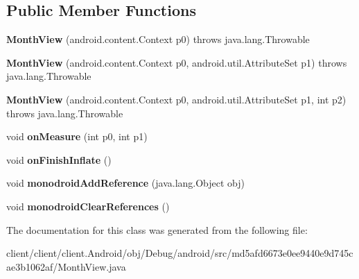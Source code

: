 \subsection*{Public Member Functions}
\begin{DoxyCompactItemize}
\item 
\hypertarget{classmd5afd6673e0ee9440e9d745cae3b1062af_1_1MonthView_a9ef524ff0f996035fa14c0d659f7e987}{}{\bfseries Month\+View} (android.\+content.\+Context p0)  throws java.\+lang.\+Throwable 	\label{classmd5afd6673e0ee9440e9d745cae3b1062af_1_1MonthView_a9ef524ff0f996035fa14c0d659f7e987}

\item 
\hypertarget{classmd5afd6673e0ee9440e9d745cae3b1062af_1_1MonthView_a6b89a92a805bdc1ae1fdb5527ba33481}{}{\bfseries Month\+View} (android.\+content.\+Context p0, android.\+util.\+Attribute\+Set p1)  throws java.\+lang.\+Throwable 	\label{classmd5afd6673e0ee9440e9d745cae3b1062af_1_1MonthView_a6b89a92a805bdc1ae1fdb5527ba33481}

\item 
\hypertarget{classmd5afd6673e0ee9440e9d745cae3b1062af_1_1MonthView_a150f9bdc858b3f7a3dc5a6b38a5537ba}{}{\bfseries Month\+View} (android.\+content.\+Context p0, android.\+util.\+Attribute\+Set p1, int p2)  throws java.\+lang.\+Throwable 	\label{classmd5afd6673e0ee9440e9d745cae3b1062af_1_1MonthView_a150f9bdc858b3f7a3dc5a6b38a5537ba}

\item 
\hypertarget{classmd5afd6673e0ee9440e9d745cae3b1062af_1_1MonthView_a44eb10d39d012a5d8ff886d362b7276f}{}void {\bfseries on\+Measure} (int p0, int p1)\label{classmd5afd6673e0ee9440e9d745cae3b1062af_1_1MonthView_a44eb10d39d012a5d8ff886d362b7276f}

\item 
\hypertarget{classmd5afd6673e0ee9440e9d745cae3b1062af_1_1MonthView_a23e6841bea8f2b24c3b89fa77025b0fc}{}void {\bfseries on\+Finish\+Inflate} ()\label{classmd5afd6673e0ee9440e9d745cae3b1062af_1_1MonthView_a23e6841bea8f2b24c3b89fa77025b0fc}

\item 
\hypertarget{classmd5afd6673e0ee9440e9d745cae3b1062af_1_1MonthView_a63a6d58e26cec9040e986d2165f15389}{}void {\bfseries monodroid\+Add\+Reference} (java.\+lang.\+Object obj)\label{classmd5afd6673e0ee9440e9d745cae3b1062af_1_1MonthView_a63a6d58e26cec9040e986d2165f15389}

\item 
\hypertarget{classmd5afd6673e0ee9440e9d745cae3b1062af_1_1MonthView_a296c9a0554ff3e663dfaa539761a27c8}{}void {\bfseries monodroid\+Clear\+References} ()\label{classmd5afd6673e0ee9440e9d745cae3b1062af_1_1MonthView_a296c9a0554ff3e663dfaa539761a27c8}

\end{DoxyCompactItemize}


The documentation for this class was generated from the following file\+:\begin{DoxyCompactItemize}
\item 
client/client/client.\+Android/obj/\+Debug/android/src/md5afd6673e0ee9440e9d745cae3b1062af/Month\+View.\+java\end{DoxyCompactItemize}
